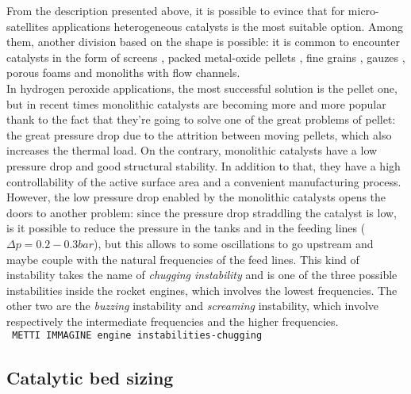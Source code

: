 \documentclass[a4paper]{report}
\begin{document}
From the description presented above, it is possible to evince that for micro-satellites applications heterogeneous catalysts is the most suitable option. Among them, another division based on the shape is possible: it is common to encounter catalysts in the form of screens %
, packed metal-oxide pellets %
, fine grains %
, gauzes %
, porous foams %
and monoliths with flow channels. %
\\
In hydrogen peroxide applications, the most successful solution is the pellet one, but in recent times monolithic catalysts are becoming more and more popular thank to the fact that they're going to solve one of the great problems of pellet: the great pressure drop due to the attrition between moving pellets, which also increases the thermal load. On the contrary, monolithic catalysts have a low pressure drop and good structural stability. In addition to that, they have a high controllability of the active surface area and a convenient manufacturing process. %
However, the low pressure drop enabled by the monolithic catalysts opens the doors to another problem: since the pressure drop straddling the catalyst is low, is it possible to reduce the pressure in the tanks and in the feeding lines ($\Delta p = 0.2-0.3 bar$), but this allows to some oscillations to go upstream and maybe couple with the natural frequencies of the feed lines. This kind of instability takes the name of \textit{chugging instability} and is one of the three possible instabilities inside the rocket engines, which involves the lowest frequencies. The other two are the \textit{buzzing} instability and \textit{screaming} instability, which involve respectively the intermediate frequencies and the higher frequencies. \\ %


\texttt{\color{red} METTI IMMAGINE engine instabilities-chugging}\\ 

\subsection{Catalytic bed sizing}
\end{document}
